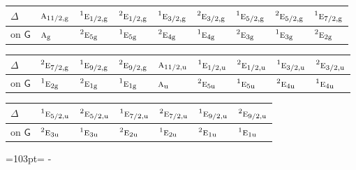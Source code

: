\documentclass[10pt,a4paper]{article}
\newcommand{\needspace}[1]{\par\penalty-100\begingroup\dimen0=#1\relax\dimen2=\pagegoal
  \advance\dimen2-\pagetotal\ifdim\dimen0>\dimen2\relax\ifdim\dimen2>0pt\vfil\break\fi\fi
  \endgroup}
\numberwithin{equation}{section}
\newcommand{\grp}[1]{\mathsf{#1}}
\newcommand{\irr}[1]{\text{\normalfont\scshape #1}}
\newcommand{\conjpair}[1]{{}^{#1}}
\newcommand{\ptag}[1]{\mathrm{#1}}
\begin{document}
\begin{center}\begin{tabular}{@{}lllllllll@{}}\toprule
$\Delta$ & $\irr{a}_{11/2,\ptag{g}}$ & $\conjpair{1}\irr{e}_{1/2,\ptag{g}}$ & $\conjpair{2}\irr{e}_{1/2,\ptag{g}}$ & $\conjpair{1}\irr{e}_{3/2,\ptag{g}}$ & $\conjpair{2}\irr{e}_{3/2,\ptag{g}}$ & $\conjpair{1}\irr{e}_{5/2,\ptag{g}}$ & $\conjpair{2}\irr{e}_{5/2,\ptag{g}}$ & $\conjpair{1}\irr{e}_{7/2,\ptag{g}}$\\\midrule
on $\grp{G}$ & $\irr{a}_{\ptag{g}}$ & $\conjpair{2}\irr{e}_{5\ptag{g}}$ & $\conjpair{1}\irr{e}_{5\ptag{g}}$ & $\conjpair{2}\irr{e}_{4\ptag{g}}$ & $\conjpair{1}\irr{e}_{4\ptag{g}}$ & $\conjpair{2}\irr{e}_{3\ptag{g}}$ & $\conjpair{1}\irr{e}_{3\ptag{g}}$ & $\conjpair{2}\irr{e}_{2\ptag{g}}$\\
\bottomrule\end{tabular}\end{center}
\begin{center}\begin{tabular}{@{}lllllllll@{}}\toprule
$\Delta$ & $\conjpair{2}\irr{e}_{7/2,\ptag{g}}$ & $\conjpair{1}\irr{e}_{9/2,\ptag{g}}$ & $\conjpair{2}\irr{e}_{9/2,\ptag{g}}$ & $\irr{a}_{11/2,\ptag{u}}$ & $\conjpair{1}\irr{e}_{1/2,\ptag{u}}$ & $\conjpair{2}\irr{e}_{1/2,\ptag{u}}$ & $\conjpair{1}\irr{e}_{3/2,\ptag{u}}$ & $\conjpair{2}\irr{e}_{3/2,\ptag{u}}$\\\midrule
on $\grp{G}$ & $\conjpair{1}\irr{e}_{2\ptag{g}}$ & $\conjpair{2}\irr{e}_{1\ptag{g}}$ & $\conjpair{1}\irr{e}_{1\ptag{g}}$ & $\irr{a}_{\ptag{u}}$ & $\conjpair{2}\irr{e}_{5\ptag{u}}$ & $\conjpair{1}\irr{e}_{5\ptag{u}}$ & $\conjpair{2}\irr{e}_{4\ptag{u}}$ & $\conjpair{1}\irr{e}_{4\ptag{u}}$\\
\bottomrule\end{tabular}\end{center}
\begin{center}\begin{tabular}{@{}lllllll@{}}\toprule
$\Delta$ & $\conjpair{1}\irr{e}_{5/2,\ptag{u}}$ & $\conjpair{2}\irr{e}_{5/2,\ptag{u}}$ & $\conjpair{1}\irr{e}_{7/2,\ptag{u}}$ & $\conjpair{2}\irr{e}_{7/2,\ptag{u}}$ & $\conjpair{1}\irr{e}_{9/2,\ptag{u}}$ & $\conjpair{2}\irr{e}_{9/2,\ptag{u}}$\\\midrule
on $\grp{G}$ & $\conjpair{2}\irr{e}_{3\ptag{u}}$ & $\conjpair{1}\irr{e}_{3\ptag{u}}$ & $\conjpair{2}\irr{e}_{2\ptag{u}}$ & $\conjpair{1}\irr{e}_{2\ptag{u}}$ & $\conjpair{2}\irr{e}_{1\ptag{u}}$ & $\conjpair{1}\irr{e}_{1\ptag{u}}$\\
\bottomrule\end{tabular}\end{center}
\needspace{103pt}
\end{document}
